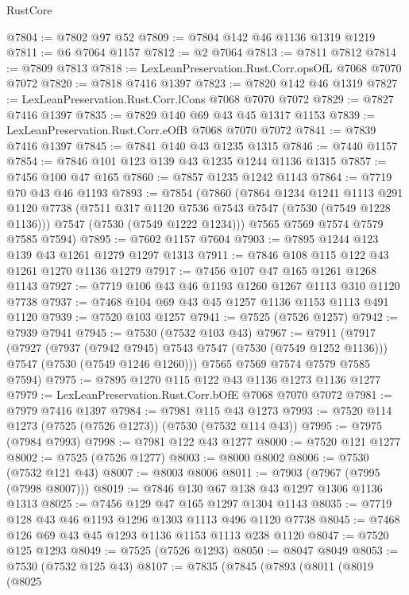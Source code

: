 \begin{lexlean}{RustCore}
\begin{coremodule}
@7804 := @7802 @97 @52
@7809 := @7804 @142 @46 @1136 @1319 @1219
@7811 := @6 @7064 @1157
@7812 := @2 @7064
@7813 := @7811 @7812
@7814 := @7809 @7813
@7818 := LexLeanPreservation.Rust.Corr.opsOfL @7068 @7070 @7072
@7820 := @7818 @7416 @1397
@7823 := @7820 @142 @46 @1319
@7827 := LexLeanPreservation.Rust.Corr.lCons @7068 @7070 @7072
@7829 := @7827 @7416 @1397
@7835 := @7829 @140 @69 @43 @45 @1317 @1153
@7839 := LexLeanPreservation.Rust.Corr.eOfB @7068 @7070 @7072
@7841 := @7839 @7416 @1397
@7845 := @7841 @140 @43 @1235 @1315
@7846 := @7440 @1157
@7854 := @7846 @101 @123 @139 @43 @1235 @1244 @1136 @1315
@7857 := @7456 @100 @47 @165
@7860 := @7857 @1235 @1242 @1143
@7864 := @7719 @70 @43 @46 @1193
@7893 := @7854
    (@7860
      (@7864
        @1234
        @1241
        @1113
        @291
        @1120
        @7738
        (@7511 @317 @1120 @7536 @7543 @7547 (@7530 (@7549 @1228 @1136)))
        @7547
        (@7530 (@7549 @1222 @1234)))
      @7565
      @7569
      @7574
      @7579
      @7585
      @7594)
@7895 := @7602 @1157 @7604
@7903 := @7895 @1244 @123 @139 @43 @1261 @1279 @1297 @1313
@7911 := @7846 @108 @115 @122 @43 @1261 @1270 @1136 @1279
@7917 := @7456 @107 @47 @165 @1261 @1268 @1143
@7927 := @7719 @106 @43 @46 @1193 @1260 @1267 @1113 @310 @1120 @7738
@7937 := @7468 @104 @69 @43 @45 @1257 @1136 @1153 @1113 @491 @1120
@7939 := @7520 @103 @1257
@7941 := @7525 (@7526 @1257)
@7942 := @7939 @7941
@7945 := @7530 (@7532 @103 @43)
@7967 := @7911
    (@7917
      (@7927
        (@7937 (@7942 @7945) @7543 @7547 (@7530 (@7549 @1252 @1136)))
        @7547
        (@7530 (@7549 @1246 @1260)))
      @7565
      @7569
      @7574
      @7579
      @7585
      @7594)
@7975 := @7895 @1270 @115 @122 @43 @1136 @1273 @1136 @1277
@7979 := LexLeanPreservation.Rust.Corr.bOfE @7068 @7070 @7072
@7981 := @7979 @7416 @1397
@7984 := @7981 @115 @43 @1273
@7993 := @7520 @114 @1273 (@7525 (@7526 @1273)) (@7530 (@7532 @114 @43))
@7995 := @7975 (@7984 @7993)
@7998 := @7981 @122 @43 @1277
@8000 := @7520 @121 @1277
@8002 := @7525 (@7526 @1277)
@8003 := @8000 @8002
@8006 := @7530 (@7532 @121 @43)
@8007 := @8003 @8006
@8011 := @7903 (@7967 (@7995 (@7998 @8007)))
@8019 := @7846 @130 @67 @138 @43 @1297 @1306 @1136 @1313
@8025 := @7456 @129 @47 @165 @1297 @1304 @1143
@8035 := @7719 @128 @43 @46 @1193 @1296 @1303 @1113 @496 @1120 @7738
@8045 := @7468 @126 @69 @43 @45 @1293 @1136 @1153 @1113 @238 @1120
@8047 := @7520 @125 @1293
@8049 := @7525 (@7526 @1293)
@8050 := @8047 @8049
@8053 := @7530 (@7532 @125 @43)
@8107 := @7835
    (@7845
      (@7893
        (@8011
          (@8019
            (@8025

\end{coremodule}
\end{lexlean}
